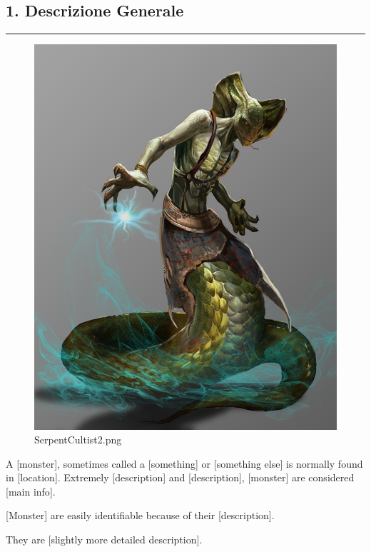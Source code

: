 \subsection{1. Descrizione Generale}\label{descrizione-generale}

\begin{center}\rule{0.5\linewidth}{0.5pt}\end{center}

\begin{figure}
\centering
\includegraphics{SerpentCultist2.png}
\caption{SerpentCultist2.png}
\end{figure}

A {[}monster{]}, sometimes called a {[}something{]} or {[}something
else{]} is normally found in {[}location{]}. Extremely {[}description{]}
and {[}description{]}, {[}monster{]} are considered {[}main info{]}.

{[}Monster{]} are easily identifiable because of their
{[}description{]}.

They are {[}slightly more detailed description{]}.

